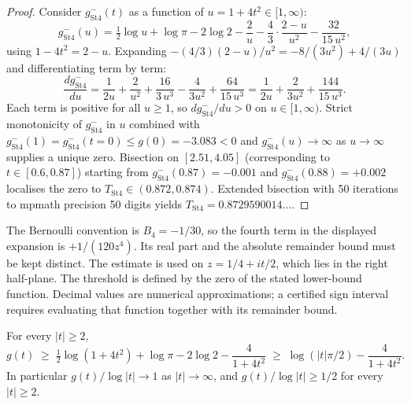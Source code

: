 \begin{proof}
Consider \(g^{-}_{\mathrm{St4}}(t)\) as a function of \(u=1+4t^{2}\in[1,\infty)\):
\begin{equation*}
g^{-}_{\mathrm{St4}}(u)=\tfrac{1}{2}\log u+\log\pi-2\log 2-\frac{2}{u}-\frac{4}{3}\cdot\frac{2-u}{u^{2}}-\frac{32}{15\,u^{2}},
\end{equation*}
using \(1-4t^{2}=2-u\). Expanding \(-(4/3)(2-u)/u^{2}=-8/(3u^{2})+4/(3u)\) and
differentiating term by term:
\begin{equation*}
\frac{d g^{-}_{\mathrm{St4}}}{du}
=\frac{1}{2u}+\frac{2}{u^{2}}+\frac{16}{3\,u^{3}}-\frac{4}{3u^{2}}+\frac{64}{15\,u^{3}}
=\frac{1}{2u}+\frac{2}{3u^{2}}+\frac{144}{15\,u^{3}}.
\end{equation*}
Each term is positive for all \(u\geq 1\), so
\(dg^{-}_{\mathrm{St4}}/du>0\) on \(u\in[1,\infty)\). Strict monotonicity
of \(g^{-}_{\mathrm{St4}}\) in \(u\) combined with
\(g^{-}_{\mathrm{St4}}(1)=g^{-}_{\mathrm{St4}}(t=0)\leq g(0)=-3.083<0\) and
\(g^{-}_{\mathrm{St4}}(u)\to\infty\) as \(u\to\infty\) supplies a unique
zero. Bisection on \([2.51,4.05]\) (corresponding to \(t\in[0.6,0.87]\))
starting from \(g^{-}_{\mathrm{St4}}(0.87)=-0.001\) and
\(g^{-}_{\mathrm{St4}}(0.88)=+0.002\) localises the zero to
\(T_{\mathrm{St4}}\in(0.872,0.874)\). Extended bisection with
50 iterations to mpmath precision 50 digits yields
\(T_{\mathrm{St4}}=0.8729590014\ldots\).
\end{proof}

\begin{remark}
\label{v4-arith:w7-a:rem:threshold-conventions}
The Bernoulli convention is \(B_4=-1/30\), so the fourth term in
the displayed expansion is \(+1/(120z^4)\). Its real part and the
absolute remainder bound must be kept distinct. The estimate is
used on \(z=1/4+it/2\), which lies in the right half-plane.
The threshold is defined by the zero of the stated lower-bound
function. Decimal values are numerical approximations; a certified
sign interval requires evaluating that function together with its
remainder bound.
\end{remark}

\begin{corollary}
\label{v4-arith:w7-a:cor:ratio-bound}
For every \(|t|\geq 2\),
\begin{equation}
\label{v4-arith:w7-a:eq:ratio-bound}
g(t)\;\geq\;\tfrac{1}{2}\log(1+4t^{2})+\log\pi-2\log 2-\frac{4}{1+4t^{2}}
\;\geq\;\log(|t|\pi/2)-\frac{4}{1+4t^{2}}.
\end{equation}
In particular \(g(t)/\log|t|\to 1\) as \(|t|\to\infty\), and
\(g(t)/\log|t|\geq 1/2\) for every \(|t|\geq 2\).
\end{corollary}

